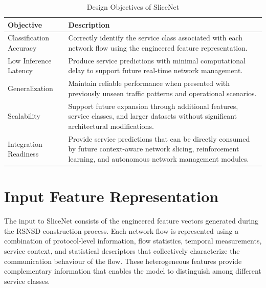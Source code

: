 \documentclass[12pt,a4paper]{report}
\begin{document}
	\begin{table}[H]
		\centering
		\caption{Design Objectives of SliceNet}
		\label{tab:slicenet_objectives}
		
		\begin{tabular}{|p{5cm}|p{7cm}|}
			\hline
			
			\textbf{Objective} &
			\textbf{Description}
			\\
			\hline
			
			Classification Accuracy &
			Correctly identify the service class associated with each network flow using the engineered feature representation.
			\\
			\hline
			
			Low Inference Latency &
			Produce service predictions with minimal computational delay to support future real-time network management.
			\\
			\hline
			
			Generalization &
			Maintain reliable performance when presented with previously unseen traffic patterns and operational scenarios.
			\\
			\hline
			
			Scalability &
			Support future expansion through additional features, service classes, and larger datasets without significant architectural modifications.
			\\
			\hline
			
			Integration Readiness &
			Provide service predictions that can be directly consumed by future context-aware network slicing, reinforcement learning, and autonomous network management modules.
			\\
			\hline
			
		\end{tabular}
		
	\end{table}
	
	\section{Input Feature Representation}
	\label{sec:features}
	
	The input to SliceNet consists of the engineered feature vectors generated during the RSNSD construction process. Each network flow is represented using a combination of protocol-level information, flow statistics, temporal measurements, service context, and statistical descriptors that collectively characterize the communication behaviour of the flow. These heterogeneous features provide complementary information that enables the model to distinguish among different service classes.
	
\end{document}
